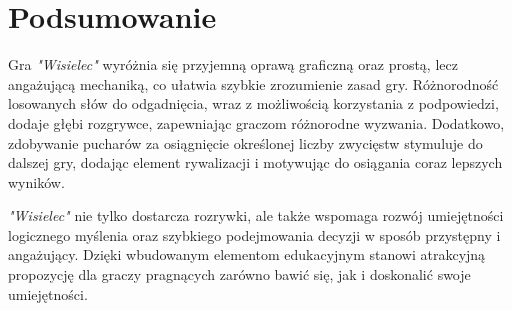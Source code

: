 \documentclass[]{report}
\begin{document}
	\newpage
	
	\section*{Podsumowanie}

Gra \textit{"Wisielec"} wyróżnia się przyjemną oprawą graficzną oraz prostą, lecz angażującą mechaniką, co ułatwia szybkie zrozumienie zasad gry. Różnorodność losowanych słów do odgadnięcia, wraz z możliwością korzystania z podpowiedzi, dodaje głębi rozgrywce, zapewniając graczom różnorodne wyzwania. Dodatkowo, zdobywanie pucharów za osiągnięcie określonej liczby zwycięstw stymuluje do dalszej gry, dodając element rywalizacji i motywując do osiągania coraz lepszych wyników.
	
	\vspace{0.5cm}

\textit{"Wisielec"} nie tylko dostarcza rozrywki, ale także wspomaga rozwój umiejętności logicznego myślenia oraz szybkiego podejmowania decyzji w sposób przystępny i angażujący. Dzięki wbudowanym elementom edukacyjnym stanowi atrakcyjną propozycję dla graczy pragnących zarówno bawić się, jak i doskonalić swoje umiejętności.
\end{document}
